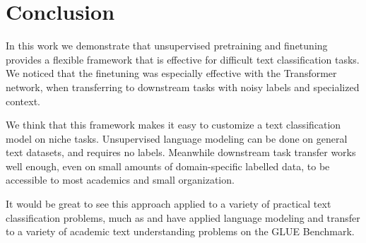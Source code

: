 \documentclass[letterpaper]{article} \usepackage{aaai19}  \usepackage{times}  \usepackage{helvet}  \usepackage{courier}  \usepackage{url}  \usepackage{graphicx}  \usepackage{booktabs}
\begin{document}
\section{Conclusion}
In this work we demonstrate that unsupervised pretraining and finetuning provides a flexible framework that is effective for difficult text classification tasks. 
We noticed that the finetuning was especially effective with the Transformer network, when transferring to downstream tasks with noisy labels and specialized context.

We think that this framework makes it easy to customize a text classification model on niche tasks. Unsupervised language modeling can be done on general text datasets, and requires no labels. Meanwhile downstream task transfer works well enough, even on small amounts of domain-specific labelled data, to be accessible to most academics and small organization. 

It would be great to see this approach applied to a variety of practical text classification problems, much as \cite{Radford2018} and \cite{devlin2018bert} have applied language modeling and transfer to a variety of academic text understanding problems on the GLUE Benchmark. 





\end{document}
